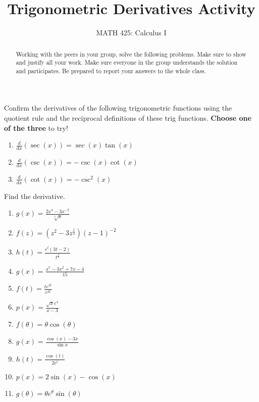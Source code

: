 \documentclass{ximera}
\title{Trigonometric Derivatives Activity}
\author{MATH 425: Calculus I}
\begin{document}
\begin{abstract}
    Working with the peers in your group, solve the following problems. Make sure to show and justify all your work. Make sure everyone in the group understands the solution and participates. Be prepared to report your answers to the whole class. 
\end{abstract}
\maketitle


\begin{exercise}
    Confirm the derivatives of the following trigonometric functions using the quotient rule and the reciprocal definitions of these trig functions.  \textbf{Choose one of the three} to try! 
    \begin{enumerate}
        \item $\frac{d}{dx}(\sec(x))=\sec(x)\tan(x)$
        \item $\frac{d}{dx}(\csc(x))=-\csc(x)\cot(x)$
        \item $\frac{d}{dx}(\cot(x))=-\csc^2(x)$
    \end{enumerate}
\end{exercise}

    
\begin{exercise}
    Find the derivative.
        \begin{enumerate}
            \item $g(x)=\frac{2x^4-3x^{-3}}{\sqrt[3]{x}}$
            \item $f(z)=(z^2-3z^{\frac{1}{4}})(z-1)^{-2}$
            \item $h(t)=\frac{e^t(3t-2)}{t^{\frac{3}{4}}}$
            \item $g(x)=\frac{x^7-3x^2+7x-4}{15}$ 
            \item $f(t)=\frac{te^{2t}}{e^{3t}}$
            \item $p(x)=\frac{\sqrt{x}e^x}{x-3}$
            \item $f(\theta)=\theta\cos(\theta)$
            \item $g(x)=\frac{\cos(x)-3x}{\sin{x}}$
            \item $h(t)=\frac{\cos(t)}{2e^t}$ 
            \item $p(x)=2\sin(x)-\cos(x)$
            \item $g(\theta)=\theta e^\theta \sin(\theta)$
        \end{enumerate}
\end{exercise}
\end{document}
